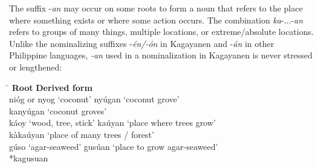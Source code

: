 The suffix -\textit{an} may occur on some roots to form a noun that refers to the place where something exists or where some action occurs. The combination \textit{ka}{}-...-\textit{an} refers to groups of many things, multiple locations, or extreme/absolute locations. Unlike the nominalizing suffixes -\textit{én/-ón} in Kagayanen and -\textit{án} in other Philippine languages, \textit{{}-an} used in a nominalization in Kagayanen is never stressed or lengthened:

\ea
\label{ex:grove}
\begin{tabbing}
\hspace{4.5cm} \= \kill
\textbf{Root} \> \textbf{Derived form} \\
nióg or nyog ‘coconut’ \>  nyúgan ‘coconut grove’ \\
\>  kanyúgan ‘coconut groves’ \\
káoy ‘wood, tree, stick’ \> kaúyan ‘place where trees grow’ \\
\>   kàkaúyan ‘place of many trees / forest’ \\
gúso ‘agar-seaweed’ \>  gusúan ‘place to grow agar-seaweed’ \\
\>   *kagusuan \\
\end{tabbing}
